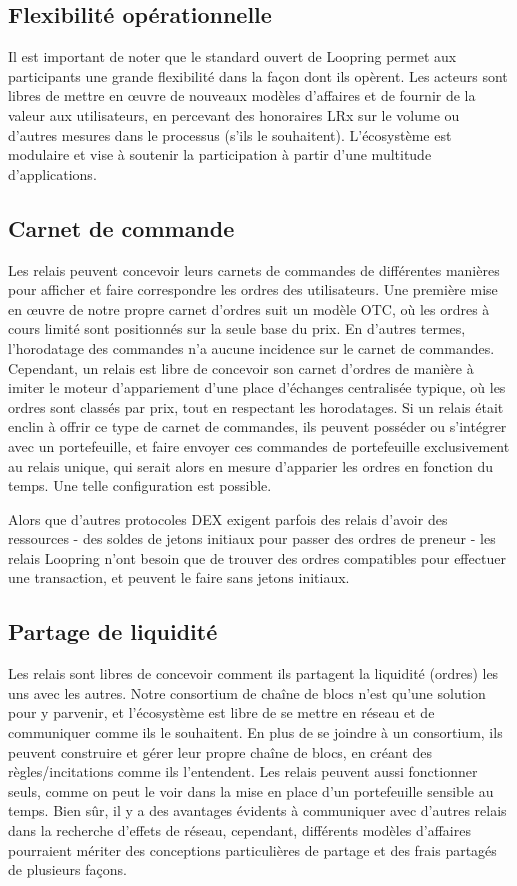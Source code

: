 \documentclass[UTF8,nofonts]{article}
\begin{document}
\begin{multicols}{2}
\section{Flexibilité opérationnelle\label{sec:business_model}}
Il est important de noter que le standard ouvert de Loopring permet aux participants une grande flexibilité dans la façon dont ils opèrent. Les acteurs sont libres de mettre en œuvre de nouveaux modèles d'affaires et de fournir de la valeur aux utilisateurs, en percevant des honoraires LRx sur le volume ou d'autres mesures dans le processus (s'ils le souhaitent). L'écosystème est modulaire et vise à soutenir la participation à partir d'une multitude d'applications.


\subsection{Carnet de commande\label{sec:order_book}}
Les relais peuvent concevoir leurs carnets de commandes de différentes manières pour afficher et faire correspondre les ordres des utilisateurs. Une première mise en œuvre de notre propre carnet d'ordres suit un modèle OTC, où les ordres à cours limité sont positionnés sur la seule base du prix. En d'autres termes, l'horodatage des commandes n'a aucune incidence sur le carnet de commandes. Cependant, un relais est libre de concevoir son carnet d'ordres de manière à imiter le moteur d'appariement d'une place d’échanges centralisée typique, où les ordres sont classés par prix, tout en respectant les horodatages. Si un relais était enclin à offrir ce type de carnet de commandes, ils peuvent posséder ou s'intégrer avec un portefeuille, et faire envoyer ces commandes de portefeuille exclusivement au relais unique, qui serait alors en mesure d'apparier les ordres en fonction du temps. Une telle configuration est possible.

Alors que d'autres protocoles DEX exigent parfois des relais d'avoir des ressources - des soldes de jetons initiaux pour passer des ordres de preneur - les relais Loopring n'ont besoin que de trouver des ordres compatibles pour effectuer une transaction, et peuvent le faire sans jetons initiaux.

\subsection{Partage de liquidité\label{sec:liquidity_sharing}}
Les relais sont libres de concevoir comment ils partagent la liquidité (ordres) les uns avec les autres. Notre consortium de chaîne de blocs n'est qu'une solution pour y parvenir, et l'écosystème est libre de se mettre en réseau et de communiquer comme ils le souhaitent. En plus de se joindre à un consortium, ils peuvent construire et gérer leur propre chaîne de blocs, en créant des règles/incitations comme ils l'entendent. Les relais peuvent aussi fonctionner seuls, comme on peut le voir dans la mise en place d'un portefeuille sensible au temps. Bien sûr, il y a des avantages évidents à communiquer avec d'autres relais dans la recherche d'effets de réseau, cependant, différents modèles d'affaires pourraient mériter des conceptions particulières de partage et des frais partagés de plusieurs façons.


\end{multicols}
\end{document}
